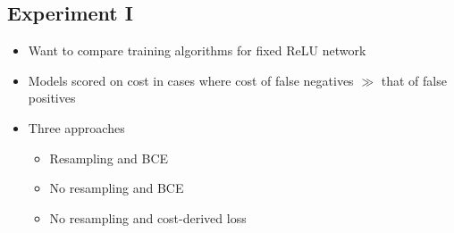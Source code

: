 \documentclass{article}
\begin{document}
  \subsection{Experiment I}
  \begin{itemize}
    \item
      Want to compare training algorithms for fixed ReLU network
    \item
      Models scored on cost in cases where cost of false negatives $\gg$ that of false positives
    \item
      Three approaches
      \begin{itemize}
        \item
          Resampling and BCE
        \item
          No resampling and BCE
        \item
          No resampling and cost-derived loss
      \end{itemize}
  \end{itemize}
%
%
%
%
\end{document}
